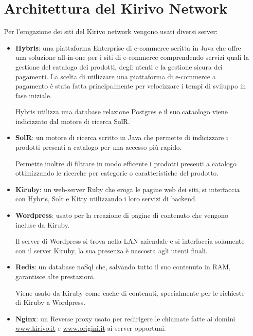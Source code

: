 \section{Architettura del Kirivo Network}
Per l'erogazione dei siti del Kirivo network vengono usati diversi server:
\begin{itemize}
\item {\bf Hybris}: una piattaforma Enterprise di e-commerce scritta in Java che offre una soluzione all-in-one per i siti 
di e-commerce comprendendo servizi quali la gestione del catalogo dei prodotti, degli utenti e la 
gestione sicura dei pagamenti. La scelta di utilizzare una piattaforma di e-commerce a pagamento è stata fatta
principalmente per velocizzare i tempi di sviluppo in fase iniziale.

Hybris utilizza una database relazione Postgres e il suo cataologo viene indicizzato dal motore di ricerca SolR.

\item {\bf SolR}: un motore di ricerca scritto in Java che permette di indicizzare i prodotti presenti a catalogo per una accesso
più rapido.

Permette inoltre di filtrare in modo efficente i prodotti presenti a catalogo ottimizzando
le ricerche per categorie o caratteristiche del prodotto.

\item {\bf Kiruby}: un web-server Ruby che eroga le pagine web dei siti, si interfaccia con Hybris, Solr e Kitty utilizzando i loro
servizi di backend. 
\item {\bf Wordpress}: usato per la creazione di pagine di contenuto che vengono incluse da Kiruby.

Il server di Wordpress si trova nella LAN aziendale e si interfaccia solamente con il server Kiruby, la sua
presenza è nascosta agli utenti finali.
\item {\bf Redis}: un database noSql che, salvando tutto il suo contenuto in RAM, garantisce alte prestazioni.

Viene usato da Kiruby come cache di contenuti, specialmente per le richieste di Kiruby a Wordpress.

\item {\bf Nginx}: un Reverse proxy usato per redirigere le chiamate fatte ai domini \url{www.kirivo.it} 
e \url{www.origini.it} ai server opportuni.
\end{itemize}

